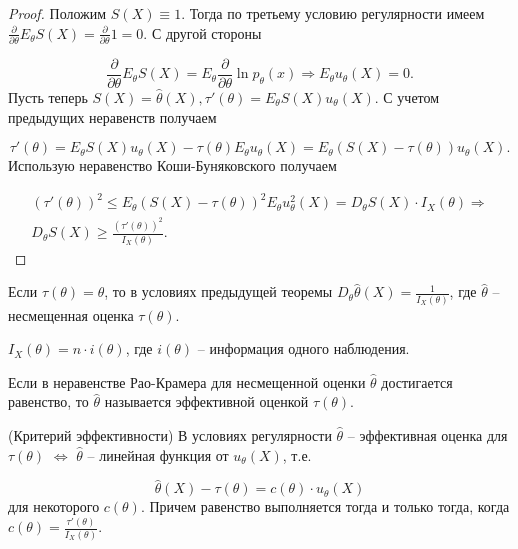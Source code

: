 \begin{proof}
Положим $\displaystyle S( X) \equiv 1$. Тогда по третьему условию регулярности имеем $\displaystyle \frac{\partial }{\partial \theta } E_{\theta } S( X) =\frac{\partial }{\partial \theta } 1=0$. С другой стороны


\begin{equation*}
\frac{\partial }{\partial \theta } E_{\theta } S( X) =E_{\theta }\frac{\partial }{\partial \theta }\ln p_{\theta }( x) \Rightarrow E_{\theta } u_{\theta }( X) =0.
\end{equation*}
Пусть теперь $\displaystyle S( X) =\hat{\theta }( X) ,\tau '( \theta ) =E_{\theta } S( X) u_{\theta }( X)$. С учетом предыдущих неравенств получаем


\begin{equation*}
\tau '( \theta ) =E_{\theta } S( X) u_{\theta }( X) -\tau ( \theta ) E_{\theta } u_{\theta }( X) =E_{\theta }( S( X) -\tau ( \theta )) u_{\theta }( X) .
\end{equation*}
Использую неравенство Коши-Буняковского получаем


\begin{gather*}
( \tau '( \theta ))^{2} \leqslant E_{\theta }( S( X) -\tau ( \theta ))^{2} E_{\theta } u_{\theta }^{2}( X) =D_{\theta } S( X) \cdotp I_{X}( \theta ) \Rightarrow \\
D_{\theta } S( X) \geqslant \frac{( \tau '( \theta ))^{2}}{I_{X}( \theta )} .
\end{gather*}
\end{proof}
\begin{corollary}
Если $\displaystyle \tau ( \theta ) =\theta $, то в условиях предыдущей теоремы $\displaystyle D_{\theta }\hat{\theta }( X) =\frac{1}{I_{X}( \theta )}$, где $\displaystyle \hat{\theta }$ -- несмещенная оценка $\displaystyle \tau ( \theta )$.
\end{corollary}
\begin{exercise}
$\displaystyle I_{X}( \theta ) =n\cdotp i( \theta )$, где $\displaystyle i( \theta )$ -- информация одного наблюдения.
\end{exercise}
\begin{definition}
Если в неравенстве Рао-Крамера для несмещенной оценки $\displaystyle \hat{\theta }$ достигается равенство, то $\displaystyle \hat{\theta }$ называется эффективной оценкой $\displaystyle \tau ( \theta )$.
\end{definition}
\begin{theorem}
(Критерий эффективности) В условиях регулярности $\displaystyle \hat{\theta }$ -- эффективная оценка для $\displaystyle \tau ( \theta )$ $\displaystyle \Leftrightarrow $ $\displaystyle \hat{\theta }$ -- линейная функция от $\displaystyle u_{\theta }( X)$, т.е.


\begin{equation*}
\hat{\theta }( X) -\tau ( \theta ) =c( \theta ) \cdotp u_{\theta }( X)
\end{equation*}
для некоторого $\displaystyle c( \theta )$. Причем равенство выполняется тогда и только тогда, когда $\displaystyle c( \theta ) =\frac{\tau '( \theta )}{I_{X}( \theta )}$.
\end{theorem}
